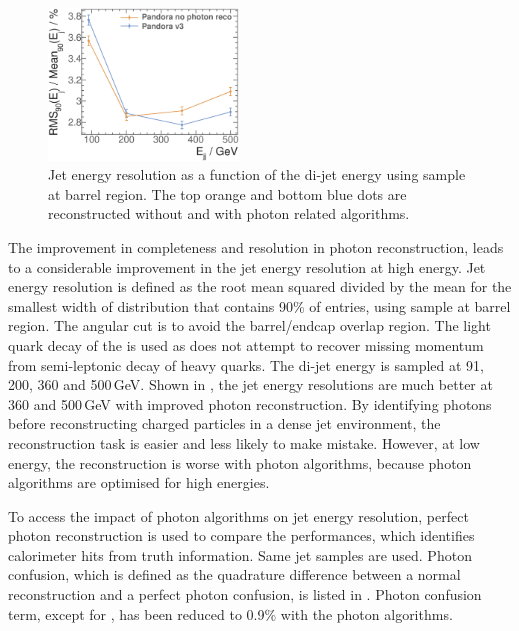 \begin{figure}[tbph]
\centering
\includegraphics[width=0.45\textwidth]{photon/JERmuon.eps}
\caption[Jet energy resolution as a function of the di-jet energy without and with photon related algorithms]
{Jet energy resolution as a function of the di-jet energy using \Zuds sample at barrel region. The top orange and bottom blue dots are reconstructed without and with photon related algorithms.}
\label{fig:photonJERmuon}
\end{figure}


The improvement in completeness and resolution in photon reconstruction, leads to a considerable improvement in the jet energy resolution at high energy. Jet energy resolution is defined as the root mean squared divided by the mean for the smallest width of distribution that contains 90\% of entries, using \Zuds sample at barrel region. The angular cut is to avoid the barrel/endcap overlap region. The light quark decay of the \PZ is used as \pandora does not attempt to recover missing momentum from semi-leptonic decay of heavy quarks. The di-jet energy is sampled at 91, 200, 360 and 500\,GeV. Shown in , the jet energy resolutions are much better at 360 and 500\,GeV with improved photon reconstruction. By identifying photons before reconstructing charged particles in a dense jet environment, the reconstruction task is easier and less likely to make mistake. However, at low energy, the reconstruction is worse with photon algorithms, because photon algorithms are optimised for high energies.

To access the impact of photon algorithms on jet energy resolution, perfect photon reconstruction is used to compare the performances, which identifies calorimeter hits from truth information. Same jet samples are used. Photon confusion, which is defined as the quadrature difference between a normal reconstruction and a perfect photon confusion, is listed in . Photon confusion term, except for , has been reduced to 0.9\% with the photon algorithms.



